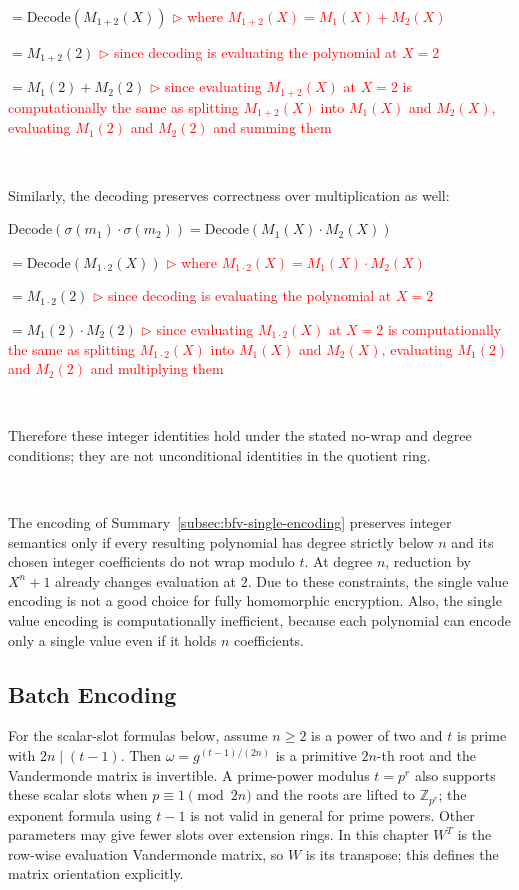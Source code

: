 $= \text{Decode}(M_{1+2}(X))$ \textcolor{red}{$\rhd$ where $M_{1+2}(X) = M_1(X) + M_2(X)$}

$= M_{1+2}(2)$ \textcolor{red}{$\rhd$ since decoding is evaluating the polynomial at $X = 2$}

$= M_{1}(2) + M_{2}(2)$ \textcolor{red}{$\rhd$ since evaluating $M_{1+2}(X)$ at $X=2$ is computationally the same as splitting $M_{1+2}(X)$ into $M_{1}(X)$ and $M_{2}(X)$, evaluating $M_1(2)$ and $M_2(2)$ and summing them}

$ $

Similarly, the decoding preserves correctness over multiplication as well:

$\text{Decode}(\sigma(m_1) \cdot \sigma(m_2)) = \text{Decode}(M_1(X) \cdot M_2(X))$

$= \text{Decode}(M_{1\cdot2}(X))$ \textcolor{red}{$\rhd$ where $M_{1\cdot2}(X) = M_1(X) \cdot M_2(X)$}

$= M_{1\cdot2}(2)$ \textcolor{red}{$\rhd$ since decoding is evaluating the polynomial at $X = 2$}

$= M_{1}(2) \cdot M_{2}(2)$ \textcolor{red}{$\rhd$ since evaluating $M_{1\cdot2}(X)$ at $X=2$ is computationally the same as splitting $M_{1\cdot2}(X)$ into $M_{1}(X)$ and $M_{2}(X)$, evaluating $M_1(2)$ and $M_2(2)$ and multiplying them}




$ $

Therefore these integer identities hold under the stated no-wrap and degree conditions; they are not unconditional identities in the quotient ring.

$ $

The encoding of Summary~\ref*{subsec:bfv-single-encoding} preserves integer semantics only if every resulting polynomial has degree strictly below $n$ and its chosen integer coefficients do not wrap modulo $t$. At degree $n$, reduction by $X^n+1$ already changes evaluation at $2$.
Due to these constraints, the single value encoding is not a good choice for fully homomorphic encryption. Also, the single value encoding is computationally inefficient, because each polynomial can encode only a single value even if it holds $n$ coefficients. 


\subsection{Batch Encoding}
\label{subsec:bfv-batch-encoding}

For the scalar-slot formulas below, assume $n\geq2$ is a power of two and $t$ is prime with $2n\mid(t-1)$. Then $\omega=g^{(t-1)/(2n)}$ is a primitive $2n$-th root and the Vandermonde matrix is invertible. A prime-power modulus $t=p^r$ also supports these scalar slots when $p\equiv1\pmod{2n}$ and the roots are lifted to $\mathbb Z_{p^r}$; the exponent formula using $t-1$ is not valid in general for prime powers. Other parameters may give fewer slots over extension rings. In this chapter $W^T$ is the row-wise evaluation Vandermonde matrix, so $W$ is its transpose; this defines the matrix orientation explicitly.

